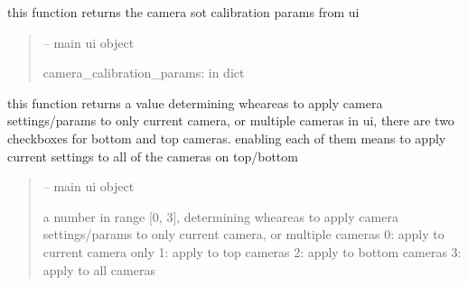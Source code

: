 \documentclass[letterpaper,10pt,english]{sphinxmanual}
\begin{document}

\begin{savenotes}\begin{fulllineitems}
\label{\detokenize{setting/backend/camera_funcs:oxin.backend.camera_funcs.get_camera_calibration_params_from_ui}}
\pysigstartsignatures
{}
\pysigstopsignatures
\sphinxAtStartPar
this function returns the camera sot calibration params from ui
\begin{quote}\begin{description}
\sphinxAtStartPar
{} – main ui object

\sphinxAtStartPar
camera\_calibration\_params: in dict

\end{description}\end{quote}

\end{fulllineitems}\end{savenotes}


\begin{savenotes}\begin{fulllineitems}
\label{\detokenize{setting/backend/camera_funcs:oxin.backend.camera_funcs.get_camera_checkbox_values}}
\pysigstartsignatures
{}
\pysigstopsignatures
\sphinxAtStartPar
this function returns a value determining wheareas to apply camera settings/params to only current camera, or multiple cameras
in ui, there are two checkboxes for bottom and top cameras. enabling each of them means to apply current settings to all of the cameras on top/bottom
\begin{quote}\begin{description}
\sphinxAtStartPar
{} – main ui object

\sphinxAtStartPar
a number in range {[}0, 3{]}, determining wheareas to apply camera settings/params to only current camera, or multiple cameras
0: apply to current camera only
1: apply to top cameras
2: apply to bottom cameras
3: apply to all cameras

\end{description}\end{quote}

\end{fulllineitems}\end{savenotes}
\end{document}
